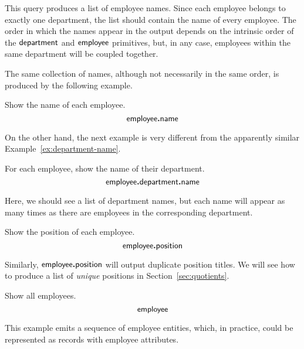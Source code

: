 This query produces a list of employee names.  Since each employee belongs to
exactly one department, the list should contain the name of every employee.
The order in which the names appear in the output depends on the intrinsic
order of the $\mathsf{department}$ and $\mathsf{employee}$ primitives, but, in any case,
employees within the same department will be coupled together.

The same collection of names, although not necessarily in the same order, is
produced by the following example.

\begin{demo}
    \label{ex:employee-name}
    Show the name of each employee.
    \begin{equation*}
        \mathsf{employee}\boldsymbol{.}\mathsf{name}
    \end{equation*}
\end{demo}

On the other hand, the next example is very different from the apparently
similar Example~\ref{ex:department-name}.

\begin{demo}
    \label{ex:employee-department-name}
    For each employee, show the name of their department.
    \begin{equation*}
        \mathsf{employee}\boldsymbol{.}\mathsf{department}\boldsymbol{.}\mathsf{name}
    \end{equation*}
\end{demo}

Here, we should see a list of department names, but each name will appear as
many times as there are employees in the corresponding department.

\begin{demo}
    \label{ex:employee-position}
    Show the position of each employee.
    \begin{equation*}
        \mathsf{employee}\boldsymbol{.}\mathsf{position}
    \end{equation*}
\end{demo}

Similarly, $\mathsf{employee}\boldsymbol{.}\mathsf{position}$ will output duplicate position titles.  We
will see how to produce a list of \emph{unique} positions in
Section~\ref{sec:quotients}.

\begin{demo}
    \label{ex:employee}
    Show all employees.
    \begin{equation*}
        \mathsf{employee}
    \end{equation*}
\end{demo}

This example emits a sequence of employee entities, which, in practice, could
be represented as records with employee attributes.

